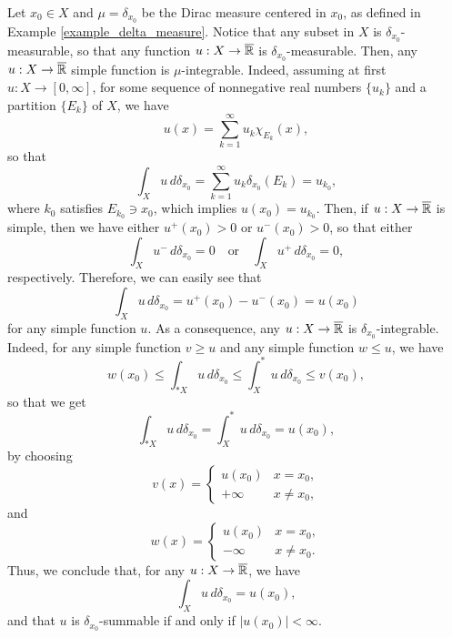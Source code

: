 \begin{example} \label{example_delta_measure_int}
Let $x_{0} \in X$ and $\mu = \delta_{x_{0}}$ be the Dirac measure centered in $x_{0}$, as defined in Example \ref{example_delta_measure}. Notice that any subset in $X$ is $\delta_{x_{0}}$-measurable, so that any function $u: X \to \overline{\mathbb{R}}$ is $\delta_{x_{0}}$-measurable. Then, any $u : X \to \overline{\mathbb{R}}$ simple function is $\mu$-integrable. Indeed, assuming at first $u : X \to [0, \infty]$, for some sequence of nonnegative real numbers $\{u_{k}\}$ and a partition $\{E_{k}\}$ of $X$, we have
\begin{equation*}
u(x) = \sum_{k=1}^\infty u_k \chi_{E_k}(x),
\end{equation*}
so that
\begin{equation*}
\int_{X} u \, d \delta_{x_{0}} = \sum_{k = 1}^{\infty} u_{k} \delta_{x_{0}}(E_{k}) = u_{k_{0}},
\end{equation*}
where $k_{0}$ satisfies $E_{k_{0}} \ni x_{0}$, which implies $u(x_{0}) = u_{k_{0}}$. Then, if $u : X \to \overline{\mathbb{R}}$ is simple, then we have either $u^{+}(x_{0}) > 0$ or $u^{-}(x_{0}) > 0$, so that either 
\begin{equation*}
\int_{X} u^{-} \, d \delta_{x_{0}} = 0 \quad \text{or} \quad \int_{X} u^{+} \, d \delta_{x_{0}}  = 0,
\end{equation*}
respectively.
Therefore, we can easily see that
\begin{equation*}
\int_{X} u \, d \delta_{x_{0}} = u^{+}(x_{0}) - u^{-}(x_{0}) = u(x_{0})
\end{equation*}
for any simple function $u$. As a consequence, any $u : X \to \overline{\mathbb{R}}$ is $\delta_{x_{0}}$-integrable. Indeed, for any simple function $v \ge u$ and any simple function $w \le u$, we have
\begin{equation*}
w(x_{0}) \le \int_{* X} u \, d\delta_{x_{0}} \le \int^*_X u \, d\delta_{x_{0}} \le v(x_{0}),
\end{equation*} 
so that we get 
\begin{equation*}
\int_{* X} u \, d\delta_{x_{0}} = \int^*_X u \, d\delta_{x_{0}} = u(x_{0}),
\end{equation*}
by choosing 
\begin{equation*}
v(x) = \begin{cases} u(x_{0}) & x = x_{0}, \\
+ \infty & x \neq x_{0},
\end{cases}
\end{equation*}
and
\begin{equation*}
w(x) = \begin{cases} u(x_{0}) & x = x_{0}, \\
- \infty & x \neq x_{0}.
\end{cases}
\end{equation*}
Thus, we conclude that, for any $u: X \to \overline{\mathbb{R}}$, we have
\begin{equation*}
\int_{X} u \, d \delta_{x_{0}} = u(x_{0}),
\end{equation*}
and that $u$ is $\delta_{x_{0}}$-summable if and only if $|u(x_{0})| < \infty$. 
\end{example}

